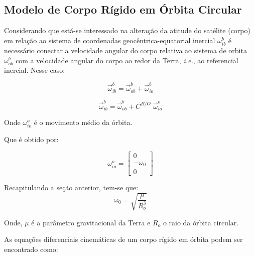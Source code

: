 \subsection{Modelo de Corpo Rígido em Órbita Circular}\label{sec:3.1.3.3}

Considerando que está-se interessado na alteração da atitude do satélite (corpo) em relação ao sistema de coordenadas geocêntrica-equatorial inercial $\omega^b_{ib}$ é necessário conectar a velocidade angular do corpo relativa ao sistema de orbita $\omega^b_{ob}$ com a velocidade angular do corpo ao redor da Terra, \textit{i.e.}, ao referencial inercial. Nesse caso:

\begin{equation}
\vec{\omega}^b_{ib}=\vec{\omega}^b_{ob}+\vec{\omega}^b_{io}
\end{equation}

\begin{equation}
\vec{\omega}^b_{ib}=\vec{\omega}^b_{ob}+C^{B/O}\;\vec{\omega}^o_{io}
\end{equation}

Onde \begin{math}\omega^o_{io}\end{math} é o movimento médio da órbita. 

Que é obtido por:

\begin{equation}\omega^o_{io} =\begin{bmatrix}0\\-\omega_0\\0
\end{bmatrix}\end{equation}

Recapitulando a seção anterior, tem-se que:
\begin{equation}\omega_0=\sqrt{\frac{\mu}{R_o^3}}\end{equation}

Onde, $\mu$ é a parâmetro gravitacional da Terra e $R_o$ o raio da órbita circular.

As equações diferenciais cinemáticas de um corpo rígido em órbita podem ser encontrado como:

